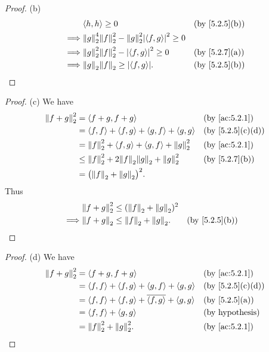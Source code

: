 \begin{proof}{(b)}
\begin{align*}
             & \inner*{h, h} \geq 0                                                     &  & \text{(by \cref{5.2.5}(b))} \\
    \implies & \norm*{g}_2^4 \norm*{f}_2^2 - \norm*{g}_2^2 \abs{\inner*{f, g}}^2 \geq 0                                  \\
    \implies & \norm*{g}_2^2 \norm*{f}_2^2 - \abs{\inner*{f, g}}^2 \geq 0               &  & \text{(by \cref{5.2.7}(a))} \\
    \implies & \norm*{g}_2 \norm*{f}_2 \geq \abs{\inner*{f, g}}.                        &  & \text{(by \cref{5.2.5}(b))}
  \end{align*}
\end{proof}

\begin{proof}{(c)}
  We have
  \begin{align*}
    \norm*{f + g}_2^2 & = \inner*{f + g, f + g}                                         &  & \by{ac:5.2.1}                  \\
                      & = \inner*{f, f} + \inner*{f, g} + \inner*{g, f} + \inner*{g, g} &  & \text{(by \cref{5.2.5}(c)(d))} \\
                      & = \norm*{f}_2^2 + \inner*{f, g} + \inner*{g, f} + \norm*{g}_2^2 &  & \by{ac:5.2.1}                  \\
                      & \leq \norm*{f}_2^2 + 2 \norm*{f}_2 \norm*{g}_2 + \norm*{g}_2^2  &  & \text{(by \cref{5.2.7}(b))}    \\
                      & = \big(\norm*{f}_2 + \norm*{g}_2\big)^2.
  \end{align*}
  Thus
  \begin{align*}
             & \norm*{f + g}_2^2 \leq (\norm*{f}_2 + \norm*{g}_2)^2                                  \\
    \implies & \norm*{f + g}_2 \leq \norm*{f}_2 + \norm*{g}_2.      &  & \text{(by \cref{5.2.5}(b))}
  \end{align*}
\end{proof}

\begin{proof}{(d)}
  We have
  \begin{align*}
    \norm*{f + g}_2^2 & = \inner*{f + g, f + g}                                                    &  & \by{ac:5.2.1}                  \\
                      & = \inner*{f, f} + \inner*{f, g} + \inner*{g, f} + \inner*{g, g}            &  & \text{(by \cref{5.2.5}(c)(d))} \\
                      & = \inner*{f, f} + \inner*{f, g} + \overline{\inner*{f, g}} + \inner*{g, g} &  & \text{(by \cref{5.2.5}(a))}    \\
                      & = \inner*{f, f} + \inner*{g, g}                                            &  & \text{(by hypothesis)}         \\
                      & = \norm*{f}_2^2 + \norm*{g}_2^2.                                           &  & \by{ac:5.2.1}
  \end{align*}
\end{proof}

